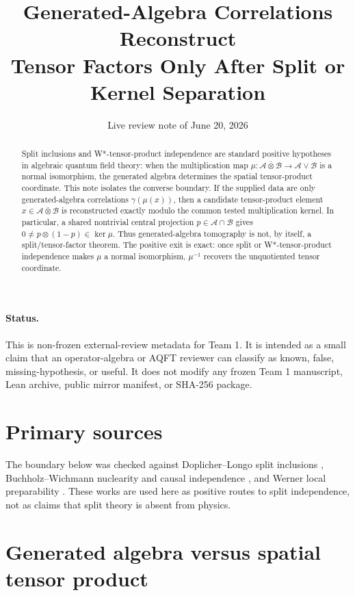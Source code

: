 \documentclass[12pt]{article}
\title{Generated-Algebra Correlations Reconstruct\\
Tensor Factors Only After Split or Kernel Separation}
\author{}
\date{Live review note of June 20, 2026}
\theoremstyle{remark}
\newcommand{\A}{\mathcal A}
\newcommand{\B}{\mathcal B}
\begin{document}
\maketitle

\begin{abstract}
Split inclusions and W*-tensor-product independence are standard positive
hypotheses in algebraic quantum field theory: when the multiplication map
\(\mu:\A\bar\otimes\B\to\A\vee\B\) is a normal isomorphism, the generated
algebra determines the spatial tensor-product coordinate.  This note isolates
the converse boundary.  If the supplied data are only generated-algebra
correlations \(\gamma(\mu(x))\), then a candidate tensor-product element
\(x\in\A\bar\otimes\B\) is reconstructed exactly modulo the common tested
multiplication kernel.  In particular, a shared nontrivial central projection
\(p\in\A\cap\B\) gives \(0\ne p\otimes(1-p)\in\ker\mu\).  Thus
generated-algebra tomography is not, by itself, a split/tensor-factor theorem.
The positive exit is exact: once split or W*-tensor-product independence makes
\(\mu\) a normal isomorphism, \(\mu^{-1}\) recovers the unquotiented tensor
coordinate.
\end{abstract}

\paragraph{Status.}
This is non-frozen external-review metadata for Team 1.  It is intended as a
small claim that an operator-algebra or AQFT reviewer can classify as known,
false, missing-hypothesis, or useful.  It does not modify any frozen Team 1
manuscript, Lean archive, public mirror manifest, or SHA-256 package.

\section{Primary sources}

The boundary below was checked against Doplicher--Longo split inclusions
\cite{DoplicherLongo}, Buchholz--Wichmann nuclearity and causal independence
\cite{BuchholzWichmann}, and Werner local preparability
\cite{WernerSplit}.  These works are used here as positive routes to split
independence, not as claims that split theory is absent from physics.

\section{Generated algebra versus spatial tensor product}
\end{document}
